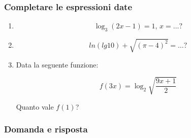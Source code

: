 \subsubsection{Completare le espressioni date}\label{subsec:compl_espr}


\begin{enumerate}
\item \begin{equation*}
\log_3(2x-1)=1\textrm{, }x=\ldots?
\end{equation*}


\item 
\begin{equation*} %
ln(lg 10)+ \sqrt{(\pi -4)^2}=\ldots?
\end{equation*}


\item 
Data la seguente funzione:

\begin{equation*}
f(3x)=\log_2{\sqrt{\frac{9x+1}{2}}}
\end{equation*}

Quanto vale $f(1)$?


\end{enumerate}

\subsubsection{Domanda e risposta}\label{subsec:dom_risp}


